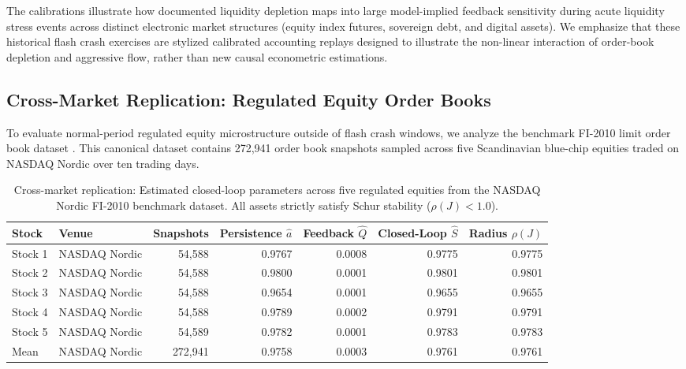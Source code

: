 \documentclass[12pt]{article}
\theoremstyle{definition}
\theoremstyle{remark}
\begin{document}
The calibrations illustrate how documented liquidity depletion maps into large model-implied feedback sensitivity during acute liquidity stress events across distinct electronic market structures (equity index futures, sovereign debt, and digital assets). We emphasize that these historical flash crash exercises are stylized calibrated accounting replays designed to illustrate the non-linear interaction of order-book depletion and aggressive flow, rather than new causal econometric estimations.

\subsection{Cross-Market Replication: Regulated Equity Order Books}
To evaluate normal-period regulated equity microstructure outside of flash crash windows, we analyze the benchmark FI-2010 limit order book dataset \citep{ntakaris2018benchmark}. This canonical dataset contains 272,941 order book snapshots sampled across five Scandinavian blue-chip equities traded on NASDAQ Nordic over ten trading days.

\begin{table}[htbp]
\centering\footnotesize
\setlength{\tabcolsep}{4pt}
\caption{Cross-market replication: Estimated closed-loop parameters across five regulated equities from the NASDAQ Nordic FI-2010 benchmark dataset. All assets strictly satisfy Schur stability ($\rho(J) < 1.0$).}
\label{tab:equity_benchmark}
\begin{tabular}{llrrrrr}\toprule
Stock & Venue & Snapshots & Persistence $\hat{a}$ & Feedback $\hat{Q}$ & Closed-Loop $\hat{S}$ & Radius $\rho(J)$ \\\midrule
Stock 1 & NASDAQ Nordic & 54,588 & 0.9767 & 0.0008 & 0.9775 & 0.9775 \\
Stock 2 & NASDAQ Nordic & 54,588 & 0.9800 & 0.0001 & 0.9801 & 0.9801 \\
Stock 3 & NASDAQ Nordic & 54,588 & 0.9654 & 0.0001 & 0.9655 & 0.9655 \\
Stock 4 & NASDAQ Nordic & 54,588 & 0.9789 & 0.0002 & 0.9791 & 0.9791 \\
Stock 5 & NASDAQ Nordic & 54,589 & 0.9782 & 0.0001 & 0.9783 & 0.9783 \\\midrule
Mean & NASDAQ Nordic & 272,941 & 0.9758 & 0.0003 & 0.9761 & 0.9761 \\\bottomrule
\end{tabular}
\end{table}
\end{document}
